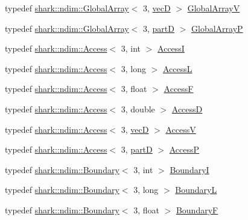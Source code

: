 \begin{DoxyCompactItemize}
\item 
typedef \hyperlink{classshark_1_1ndim_1_1_global_array}{shark\+::ndim\+::\+Global\+Array}$<$ 3, \hyperlink{namespaceshark_1_1types3d_a2ad4ea08e8e6d62a99ffef91988c717c}{vecD} $>$ \hyperlink{namespaceshark_1_1types3d_aec3cdabf4a11526d4bbaebbc71f5071c}{Global\+ArrayV}
\item 
typedef \hyperlink{classshark_1_1ndim_1_1_global_array}{shark\+::ndim\+::\+Global\+Array}$<$ 3, \hyperlink{namespaceshark_1_1types3d_a8ba1ca83346f7674ce78342d0dc516ce}{partD} $>$ \hyperlink{namespaceshark_1_1types3d_ad2ba10d502326eab75658f1866c951fe}{Global\+ArrayP}
\item 
typedef \hyperlink{classshark_1_1ndim_1_1_access}{shark\+::ndim\+::\+Access}$<$ 3, int $>$ \hyperlink{namespaceshark_1_1types3d_ae71f2ec0e62d8216cfd724df50682326}{AccessI}
\item 
typedef \hyperlink{classshark_1_1ndim_1_1_access}{shark\+::ndim\+::\+Access}$<$ 3, long $>$ \hyperlink{namespaceshark_1_1types3d_ab888022609e08413bb84503cfeb3d205}{AccessL}
\item 
typedef \hyperlink{classshark_1_1ndim_1_1_access}{shark\+::ndim\+::\+Access}$<$ 3, float $>$ \hyperlink{namespaceshark_1_1types3d_a3c9bf12e0ef0af2d09be323b967710fe}{AccessF}
\item 
typedef \hyperlink{classshark_1_1ndim_1_1_access}{shark\+::ndim\+::\+Access}$<$ 3, double $>$ \hyperlink{namespaceshark_1_1types3d_a795ec6a520ff1e94b450e6c49306c121}{AccessD}
\item 
typedef \hyperlink{classshark_1_1ndim_1_1_access}{shark\+::ndim\+::\+Access}$<$ 3, \hyperlink{namespaceshark_1_1types3d_a2ad4ea08e8e6d62a99ffef91988c717c}{vecD} $>$ \hyperlink{namespaceshark_1_1types3d_add4579ebeb71c8363baba06d4ea576f3}{AccessV}
\item 
typedef \hyperlink{classshark_1_1ndim_1_1_access}{shark\+::ndim\+::\+Access}$<$ 3, \hyperlink{namespaceshark_1_1types3d_a8ba1ca83346f7674ce78342d0dc516ce}{partD} $>$ \hyperlink{namespaceshark_1_1types3d_a38a0a0a9d26919043ef652cb281ee952}{AccessP}
\item 
typedef \hyperlink{classshark_1_1ndim_1_1_boundary}{shark\+::ndim\+::\+Boundary}$<$ 3, int $>$ \hyperlink{namespaceshark_1_1types3d_a045f7fae1a016d00a39f36f1dfc16e65}{BoundaryI}
\item 
typedef \hyperlink{classshark_1_1ndim_1_1_boundary}{shark\+::ndim\+::\+Boundary}$<$ 3, long $>$ \hyperlink{namespaceshark_1_1types3d_ae79df5e696fb92ea1db5c496e62c40cc}{BoundaryL}
\item 
typedef \hyperlink{classshark_1_1ndim_1_1_boundary}{shark\+::ndim\+::\+Boundary}$<$ 3, float $>$ \hyperlink{namespaceshark_1_1types3d_a6bcca8dc908860524a26a4a90c5449bb}{BoundaryF}

\end{DoxyCompactItemize}
